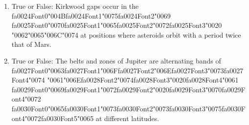 \documentclass[12pt]{article}
\begin{document}
\begin{enumerate}[label=\arabic*.]
\item True or False: Kirkwood gaps occur in the {\csname fa0024Font0\endcsname\char"004B}{\csname fa0024Font1\endcsname\char"0075}{\csname fa0024Font2\endcsname\char"0069} {\csname fa0025Font0\endcsname\char"0070}{\csname fa0025Font1\endcsname\char"0065}{\csname fa0025Font2\endcsname\char"0072}{\csname fa0025Font3\endcsname\char"0020} {\char"0062}{\char"0065}{\char"006C}{\char"0074} at positions where asteroids orbit with a period twice that of Mars.
\item True or False: The belts and zones of Jupiter are alternating bands of {\csname fa0027Font0\endcsname\char"0063}{\csname fa0027Font1\endcsname\char"006F}{\csname fa0027Font2\endcsname\char"006E}{\csname fa0027Font3\endcsname\char"0073}{\csname fa0027Font4\endcsname\char"0074} {\char"0061}{\char"006E}{\csname fa0028Font2\endcsname\char"0074}{\csname fa0028Font3\endcsname\char"0020}{\csname fa0028Font4\endcsname\char"0061} {\csname fa0029Font0\endcsname\char"0069}{\csname fa0029Font1\endcsname\char"0072}{\csname fa0029Font2\endcsname\char"0020}{\csname fa0029Font3\endcsname\char"0070}{\csname fa0029Font4\endcsname\char"0072} {\csname fa0030Font0\endcsname\char"0065}{\csname fa0030Font1\endcsname\char"0073}{\csname fa0030Font2\endcsname\char"0073}{\csname fa0030Font3\endcsname\char"0075}{\csname fa0030Font4\endcsname\char"0072}{\csname fa0030Font5\endcsname\char"0065} at different latitudes.
\end{enumerate}
\end{document}
